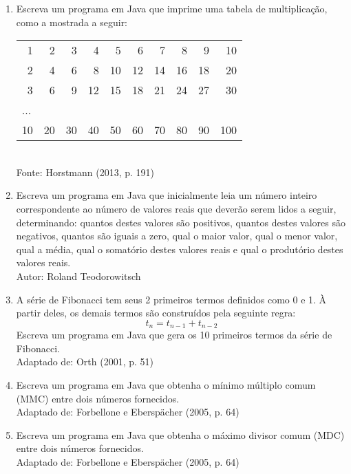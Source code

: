 \documentclass[onecolumn,a4paper,10pt]{report}
\newcommand{\+}{\, + \,}
\newcommand{\<}{\hspace*{-0.4cm}}
\begin{document}
\begin{enumerate}[1.]
\item Escreva um programa em Java que imprime uma tabela de multiplicação, como a mostrada a seguir:\\
\begin{tabular}{rrrrrrrrrr}
1 & 2 & 3 & 4 & 5 & 6 & 7 & 8 & 9 & 10\\
2 & 4 & 6 & 8 & 10 & 12 & 14 & 16 & 18 & 20\\
3 & 6 & 9 & 12 & 15 & 18 & 21 & 24 & 27 & 30\\
\multicolumn{10}{l}{...}\\
10 & 20 & 30 & 40 & 50 & 60 & 70 & 80 & 90 & 100\\
\end{tabular}\\
{\tiny Fonte: Horstmann (2013, p. 191)}

\item Escreva um programa em Java que inicialmente leia um número inteiro correspondente ao número de valores reais que deverão serem lidos a seguir, determinando: quantos destes valores são positivos, quantos destes valores são negativos, quantos são iguais a zero, qual o maior valor, qual o menor valor, qual a média, qual o somatório destes valores reais e qual o produtório destes valores reais.\\
{\tiny Autor: Roland Teodorowitsch}

\item A série de Fibonacci tem seus 2 primeiros termos definidos como 0 e 1. À partir deles, os demais termos são construídos pela seguinte regra:
\[ t_n = t_{n-1} + t_{n-2}\]
Escreva um programa em Java que gera os 10 primeiros termos da série de Fibonacci.\\
{\tiny Adaptado de: Orth (2001, p. 51)}

\item Escreva um programa em Java que obtenha o mínimo múltiplo comum (MMC) entre dois números fornecidos.\\
{\tiny Adaptado de: Forbellone e Eberspächer (2005, p. 64)}

\item Escreva um programa em Java que obtenha o máximo divisor comum (MDC) entre dois números fornecidos.\\
{\tiny Adaptado de: Forbellone e Eberspächer (2005, p. 64)}


\end{enumerate}
\end{document}
